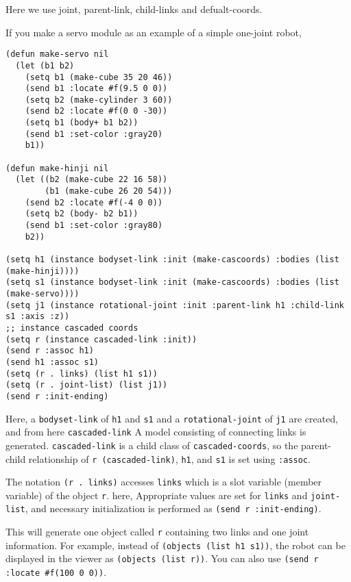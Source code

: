 Here we use joint, parent-link, child-links and defualt-coords.

If you make a servo module as an example of a simple one-joint robot,
{\baselineskip=10pt
\begin{verbatim}
(defun make-servo nil
  (let (b1 b2)
    (setq b1 (make-cube 35 20 46))
    (send b1 :locate #f(9.5 0 0))
    (setq b2 (make-cylinder 3 60))
    (send b2 :locate #f(0 0 -30))
    (setq b1 (body+ b1 b2))
    (send b1 :set-color :gray20)
    b1))

(defun make-hinji nil
  (let ((b2 (make-cube 22 16 58))
        (b1 (make-cube 26 20 54)))
    (send b2 :locate #f(-4 0 0))
    (setq b2 (body- b2 b1))
    (send b1 :set-color :gray80)
    b2))

(setq h1 (instance bodyset-link :init (make-cascoords) :bodies (list (make-hinji))))
(setq s1 (instance bodyset-link :init (make-cascoords) :bodies (list (make-servo))))
(setq j1 (instance rotational-joint :init :parent-link h1 :child-link s1 :axis :z))
;; instance cascaded coords
(setq r (instance cascaded-link :init))
(send r :assoc h1)
(send h1 :assoc s1)
(setq (r . links) (list h1 s1))
(setq (r . joint-list) (list j1))
(send r :init-ending)
\end{verbatim}
}


Here, a \verb|bodyset-link| of \verb|h1| and \verb|s1| and a \verb|rotational-joint| of \verb|j1| are created, and from here \verb|cascaded-link| A model consisting of connecting links is generated.
\verb|cascaded-link| is a child class of \verb|cascaded-coords|, so the parent-child relationship of \verb|r (cascaded-link)|, \verb|h1|, and \verb|s1| is set using \verb|:assoc|.

The notation \verb|(r . links)| accesses \verb|links| which is a slot variable (member variable) of the object \verb|r|. here,
Appropriate values are set for \verb|links| and \verb|joint-list|, and necessary initialization is performed as \verb|(send r :init-ending)|.

This will generate one object called \verb|r| containing two links and one joint information. For example, instead of \verb|(objects (list h1 s1))|, the robot can be displayed in the viewer as \verb|(objects (list r))|.
You can also use \verb|(send r :locate #f(100 0 0))|.

